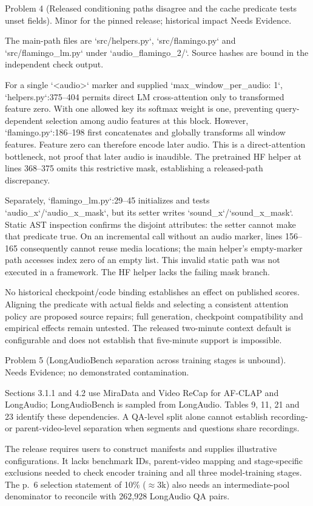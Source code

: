 \documentclass[10pt]{article}
\begin{document}
Problem 4 (Released conditioning paths disagree and the cache predicate tests unset fields).  Minor for the pinned release; historical impact Needs Evidence.\par
The main-path files are `src/helpers.py`, `src/flamingo.py` and `src/flamingo\_lm.py` under `audio\_flamingo\_2/`. Source hashes are bound in the independent check output.\par
For a single `<audio>` marker and supplied `max\_window\_per\_audio: 1`, `helpers.py`:375–404 permits direct LM cross-attention only to transformed feature zero. With one allowed key its softmax weight is one, preventing query-dependent selection among audio features at this block. However, `flamingo.py`:186–198 first concatenates and globally transforms all window features. Feature zero can therefore encode later audio. This is a direct-attention bottleneck, not proof that later audio is inaudible. The pretrained HF helper at lines 368–375 omits this restrictive mask, establishing a released-path discrepancy.\par
Separately, `flamingo\_lm.py`:29–45 initializes and tests `audio\_x`/`audio\_x\_mask`, but its setter writes `sound\_x`/`sound\_x\_mask`. Static AST inspection confirms the disjoint attributes: the setter cannot make that predicate true. On an incremental call without an audio marker, lines 156–165 consequently cannot reuse media locations; the main helper’s empty-marker path accesses index zero of an empty list. This invalid static path was not executed in a framework. The HF helper lacks the failing mask branch.\par
No historical checkpoint/code binding establishes an effect on published scores. Aligning the predicate with actual fields and selecting a consistent attention policy are proposed source repairs; full generation, checkpoint compatibility and empirical effects remain untested. The released two-minute context default is configurable and does not establish that five-minute support is impossible.\par
Problem 5 (LongAudioBench separation across training stages is unbound).  Needs Evidence; no demonstrated contamination.\par
Sections 3.1.1 and 4.2 use MiraData and Video ReCap for AF-CLAP and LongAudio; LongAudioBench is sampled from LongAudio. Tables 9, 11, 21 and 23 identify these dependencies. A QA-level split alone cannot establish recording- or parent-video-level separation when segments and questions share recordings.\par
The release requires users to construct manifests and supplies illustrative configurations. It lacks benchmark IDs, parent-video mapping and stage-specific exclusions needed to check encoder training and all three model-training stages. The p. 6 selection statement of 10\% (\(\approx3\)k) also needs an intermediate-pool denominator to reconcile with 262,928 LongAudio QA pairs.\par
\end{document}
